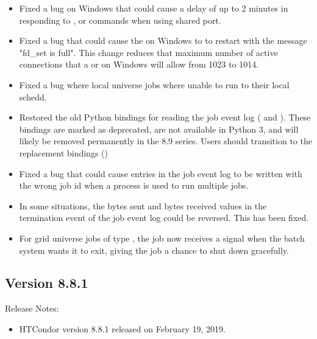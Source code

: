 \begin{itemize}
\item Fixed a bug on Windows that could cause a delay of up to 2 minutes in responding
to ,  or  commands when using shared port.

\item Fixed a bug that could cause the  on Windows to to restart with the message
"fd\_set is full".  This change reduces that maximum number of active connections that
a  or  on Windows will allow from 1023 to 1014.

\item Fixed a bug where local universe jobs where unable to run
 to their local schedd.

\item Restored the old Python bindings for reading the job event log
( and ).
These bindings are marked as deprecated, are not available in
Python 3, and will likely be removed permanently in the 8.9 series.
Users should transition to the replacement bindings ()

\item Fixed a bug that could cause entries in the job event log to be
written with the wrong job id when a  process is used to
run multiple jobs.

\item In some situations, the bytes sent and bytes received values in
the termination event of the job event log could be reversed.
This has been fixed.

\item For grid universe jobs of type , the job now receives a
signal when the batch system wants it to exit, giving the job a chance to
shut down gracefully.

\end{itemize}

\subsection*{\label{sec:New-8-8-1}Version 8.8.1}

\noindent Release Notes:

\begin{itemize}

\item HTCondor version 8.8.1 released on February 19, 2019.

\end{itemize}

